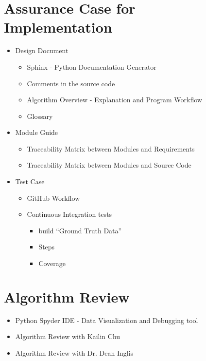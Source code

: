 \section{Assurance Case for Implementation}
\begin{itemize}
\item Design Document
\begin{itemize}
\item Sphinx - Python Documentation Generator
\item Comments in the source code
\item Algorithm Overview - Explanation and Program Workflow
\item Glossary
\end{itemize}
\item Module Guide
\begin{itemize}
\item Traceability Matrix between Modules and Requirements
\item Traceability Matrix between Modules and Source Code
\end{itemize}

\item Test Case
\begin{itemize}
\item GitHub Workflow
\item Continuous Integration tests
\begin{itemize}
\item build ``Ground Truth Data''
\item Steps
\item Coverage
\end{itemize}
\end{itemize}

\end{itemize}

\section{Algorithm Review}
\begin{itemize}
\item Python Spyder IDE - Data Visualization and Debugging tool
\item Algorithm Review with Kailin Chu
\item Algorithm Review with Dr. Dean Inglis
\end{itemize}


